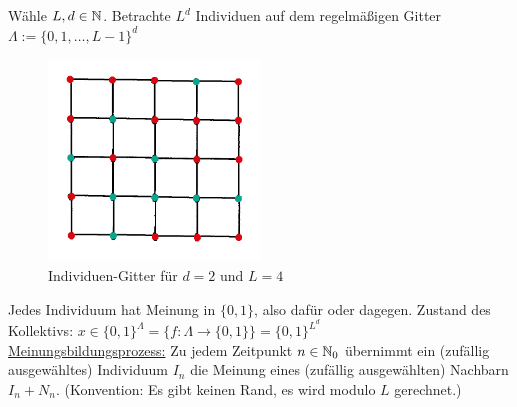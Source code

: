 \begin{beisp}[Wählermodell]\enter
Wähle $L,d\in\mathbb{N}$. Betrachte $L^d$ Individuen auf dem regelmäßigen Gitter\\ $\Lambda:=\lbrace 0,1,\ldots,L-1\rbrace^d$
\begin{figure}[h!]
	\begin{center}
		\includegraphics[width=0.5\textwidth]{./pics/Sketch1.png}
		\caption{Individuen-Gitter für $d=2$ und $L=4$}
		\label{AbbGitter}
	\end{center}
\end{figure}

Jedes Individuum hat Meinung in $\lbrace0,1\rbrace$, also dafür oder dagegen. Zustand des Kollektivs:
$x\in\lbrace0,1\rbrace^{\Lambda}=\big\lbrace f:\Lambda\to\lbrace 0,1\rbrace\big\rbrace=\lbrace0,1\rbrace^{L^d}$\\

\ul{Meinungsbildungsprozess:} Zu jedem Zeitpunkt $n\in\mathbb{N}_0$ übernimmt ein (zufällig ausgewähltes) Individuum $I_n$ die Meinung eines (zufällig ausgewählten) Nachbarn $I_n+N_n$. (Konvention: Es gibt keinen Rand, es wird modulo $L$ gerechnet.)\\


\end{beisp}
